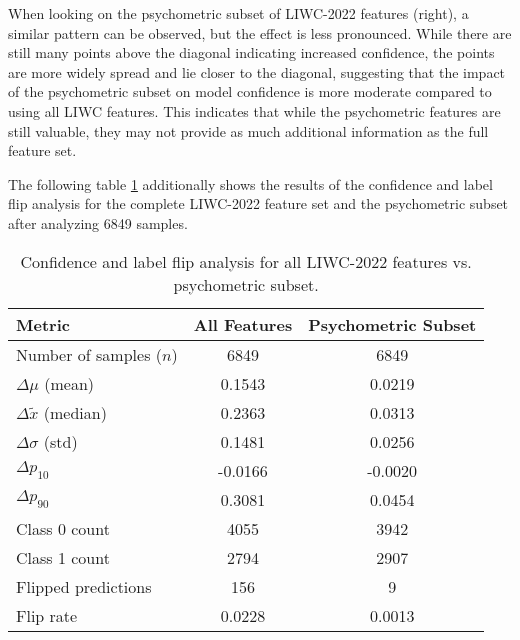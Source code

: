When looking on the psychometric subset of LIWC-2022 features (right), a similar pattern can be observed, but the effect is less pronounced. While there are still many points above the diagonal indicating increased confidence, the points are more widely spread and lie closer to the diagonal, suggesting that the impact of the psychometric subset on model confidence is more moderate compared to using all LIWC features. This indicates that while the psychometric features are still valuable, they may not provide as much additional information as the full feature set.

The following table \ref{tab:confidence_label_flip} additionally shows the results of the confidence and label flip analysis for the complete LIWC-2022 feature set and the psychometric subset after analyzing 6849 samples.


\begin{table}[H]
\centering
\caption{Confidence and label flip analysis for all LIWC-2022 features vs. psychometric subset.}
\begin{tabular}{lcc}
\toprule
\textbf{Metric} & \textbf{All Features} & \textbf{Psychometric Subset} \\
\midrule
Number of samples ($n$)            & 6849    & 6849 \\
$\Delta \mu$ (mean)                & 0.1543  & 0.0219 \\
$\Delta \tilde{x}$ (median)        & 0.2363  & 0.0313 \\
$\Delta \sigma$ (std)              & 0.1481  & 0.0256 \\
$\Delta p_{10}$                    & -0.0166 & -0.0020 \\
$\Delta p_{90}$                    & 0.3081  & 0.0454 \\
Class 0 count                      & 4055    & 3942 \\
Class 1 count                      & 2794    & 2907 \\
Flipped predictions                & 156     & 9 \\
Flip rate                          & 0.0228  & 0.0013 \\
\bottomrule
\end{tabular}
\label{tab:confidence_label_flip}
\end{table}

